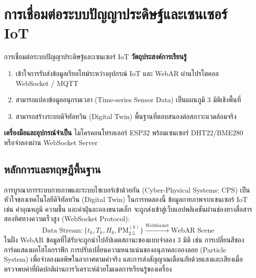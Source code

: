 
\chapter{การเชื่อมต่อระบบปัญญาประดิษฐ์และเซนเซอร์ IoT}
\label{ch:lab06}


\vspace{0.4cm}

\begin{labobjectivebox}{การเชื่อมต่อระบบปัญญาประดิษฐ์และเซนเซอร์ IoT}
\textbf{วัตถุประสงค์การเรียนรู้}
\begin{enumerate}[leftmargin=1.8cm, itemsep=2pt]
    \item เข้าใจการรับส่งข้อมูลเรียลไทม์ระหว่างอุปกรณ์ IoT และ WebAR ผ่านโปรโตคอล WebSocket / MQTT
    \item สามารถแปลงข้อมูลอนุกรมเวลา (Time-series Sensor Data) เป็นแผนภูมิ 3 มิติเชิงพื้นที่
    \item สามารถสร้างระบบดิจิทัลทวิน (Digital Twin) พื้นฐานที่ตอบสนองต่อสภาวะแวดล้อมจริง
\end{enumerate}

\vspace{4pt}
\textbf{เครื่องมือและอุปกรณ์จำเป็น} \enspace ไมโครคอนโทรลเลอร์ ESP32 พร้อมเซนเซอร์ DHT22/BME280 หรือจำลองผ่าน WebSocket Server
\end{labobjectivebox}

\section{หลักการและทฤษฎีพื้นฐาน}

การบูรณาการระบบกายภาพและระบบไซเบอร์เข้าด้วยกัน (Cyber-Physical Systems: CPS) เป็นหัวใจของเทคโนโลยีดิจิทัลทวิน (Digital Twin) ในการทดลองนี้ ข้อมูลกายภาพจากเซนเซอร์ IoT เช่น ค่าอุณหภูมิ ความชื้น และค่าฝุ่นละอองขนาดเล็ก จะถูกส่งเข้าสู่เว็บแอปพลิเคชันผ่านช่องทางสื่อสารสองทิศทางความเร็วสูง (WebSocket Protocol):
\begin{equation}
\text{Data Stream}: \{ t_k, T_k, H_k, \text{PM}_{2.5}^{(k)} \} \xrightarrow{\text{WebSocket}} \text{WebAR Scene}
\end{equation}
ในฝั่ง WebAR ข้อมูลที่ได้รับจะถูกนำไปอัปเดตสถานะของแบบจำลอง 3 มิติ เช่น การเปลี่ยนสีของการ์ดแสดงผลโฮโลกราฟิก การปรับเปลี่ยนความหนาแน่นของอนุภาคละอองลอย (Particle System) เพื่อจำลองมลพิษในอากาศตามค่าจริง และการส่งสัญญาณเตือนภัยด้วยแสงและเสียงเมื่อตรวจพบค่าที่ผิดปกติผ่านการวิเคราะห์ด้วยโมเดลการเรียนรู้ของเครื่อง

